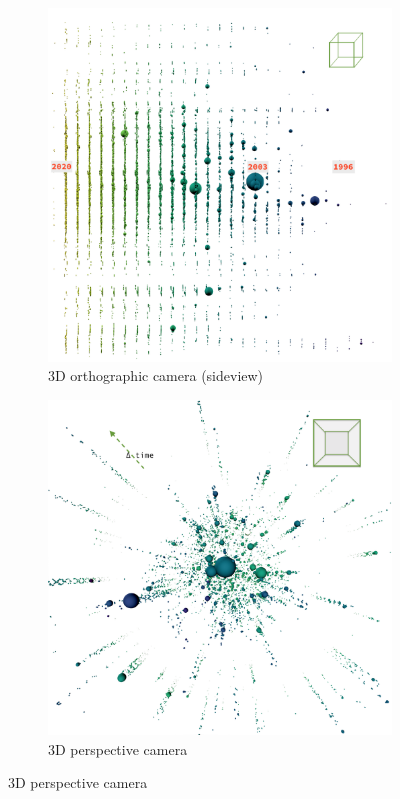 \begin{figure}[H]
\begin{subfigure}{0.47\textwidth}
         \includegraphics[width=\textwidth]{figures_c3/sideall.png}
         \caption{3D orthographic camera (sideview)}
         \label{fig:sideweb}
     \end{subfigure}
     \hfill

     \begin{subfigure}[b]{0.75\textwidth}
         \centering
         \includegraphics[width=\textwidth]{figures_c3/threeall.png}
         \caption{3D perspective camera}
         \label{fig:3dgeph}
     \end{subfigure}



\end{figure}
